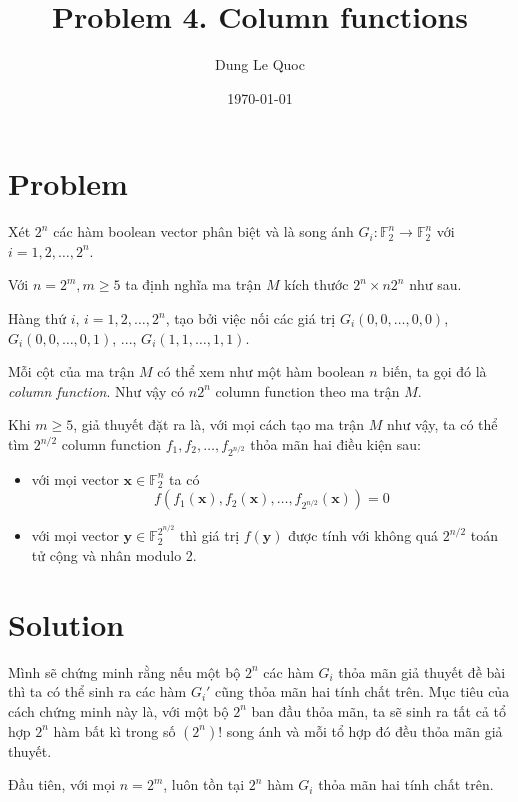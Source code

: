 \documentclass{article}
\title{Problem 4. Column functions}
\author{Dung Le Quoc}
\date{\today}
\newcommand{\FF}{\mathbb{F}}
\begin{document}
\maketitle

\section{Problem}

Xét $2^n$ các hàm boolean vector phân biệt và là song ánh $G_i: \FF_2^n \to \FF_2^n$ với $i = 1, 2, \ldots, 2^n$.

Với $n = 2^m, m \geq 5$ ta định nghĩa ma trận $M$ kích thước $2^n \times n 2^n$ như sau.

Hàng thứ $i$, $i = 1, 2, \ldots, 2^n$, tạo bởi việc nối các giá trị $G_i(0, 0, \ldots, 0, 0)$, $G_i(0, 0, \ldots, 0, 1)$, ..., $G_i(1, 1, \ldots, 1, 1)$.

Mỗi cột của ma trận $M$ có thể xem như một hàm boolean $n$ biến, ta gọi đó là \textit{column function}. Như vậy có $n 2^n$ column function theo ma trận $M$.

Khi $m \geq 5$, giả thuyết đặt ra là, với mọi cách tạo ma trận $M$ như vậy, ta có thể tìm $2^{n/2}$ column function $f_1, f_2, \ldots, f_{2^{n/2}}$ thỏa mãn hai điều kiện sau:

\begin{itemize}
    \item với mọi vector $\bm{x} \in \FF_2^n$ ta có \[ f(f_1(\bm{x}), f_2(\bm{x}), \ldots, f_{2^{n/2}}(\bm{x})) = 0 \]
    \item với mọi vector $\bm{y} \in \FF_2^{2^{n/2}}$ thì giá trị $f(\bm{y})$ được tính với không quá $2^{n/2}$ toán tử cộng và nhân modulo 2.
\end{itemize}

\section{Solution}

Mình sẽ chứng minh rằng nếu một bộ $2^n$ các hàm $G_i$ thỏa mãn giả thuyết đề bài thì ta có thể sinh ra các hàm $G_i'$ cũng thỏa mãn hai tính chất trên. Mục tiêu của cách chứng minh này là, với một bộ $2^n$ ban đầu thỏa mãn, ta sẽ sinh ra tất cả tổ hợp $2^n$ hàm bất kì trong số $(2^n)!$ song ánh và mỗi tổ hợp đó đều thỏa mãn giả thuyết.

Đầu tiên, với mọi $n=2^m$, luôn tồn tại $2^n$ hàm $G_i$ thỏa mãn hai tính chất trên.
\end{document}
